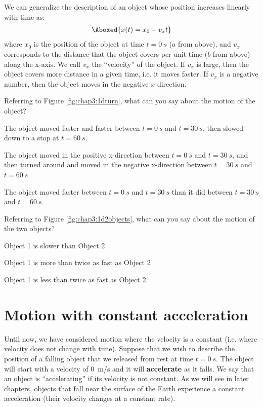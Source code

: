 We can generalize the description of an object whose position increases linearly with time as:
\begin{align}
\label{eqn:chap3:1dxvst_noa}
\Aboxed{x(t) = x_0 + v_xt}
\end{align}
where $x_0$ is the position of the object at time $t=\SI{0}{s}$ ($a$ from above), and $v_x$ corresponds to the distance that the object covers per unit time ($b$ from above) along the x-axis. We call $v_x$ the ``velocity'' of the object. If $v_x$ is large, then the object covers more distance in a given time, i.e. it moves faster. If $v_x$ is a negative number, then the object moves in the negative $x$ direction.

\begin{checkpointMC}{Referring to Figure \ref{fig:chap3:1dturn}, what can you say about the motion of the object? }
\item The object moved faster and faster between $t=\SI{0}{s}$ and $t=\SI{30}{s}$, then slowed down to a stop at $t=\SI{60}{s}$.
\item The object moved in the positive x-direction between $t=\SI{0}{s}$ and $t=\SI{30}{s}$, and then turned around and moved in the negative x-direction between $t=\SI{30}{s}$ and $t=\SI{60}{s}$. %
\item The object moved faster between $t=\SI{0}{s}$ and $t=\SI{30}{s}$ than it did between $t=\SI{30}{s}$ and $t=\SI{60}{s}$.
\end{checkpointMC}

\begin{checkpointMC}{Referring to Figure \ref{fig:chap3:1d2objects}, what can you say about the motion of the two objects? }
\item Object 1 is slower than Object 2
\item Object 1 is more than twice as fast as Object 2 %
\item Object 1 is less than twice as fast as Object 2
\end{checkpointMC}

\section{Motion with constant acceleration}
Until now, we have considered motion where the velocity is a constant (i.e. where velocity does not change with time). Suppose that we wish to describe the position of a falling object that we released from rest at time $t=\SI{0}{s}$. The object will start with a velocity of \SI{0}{m/s} and it will \textbf{accelerate} as it falls. We say that an object is ``accelerating'' if its velocity is not constant. As we will see in later chapters, objects that fall near the surface of the Earth experience a constant acceleration (their velocity changes at a constant rate).

